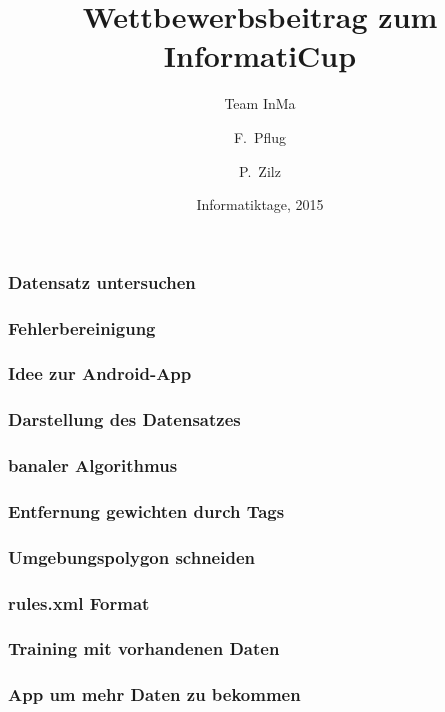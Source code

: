 \documentclass{beamer}
\title[Wettbewerbsbeitrag] %
{Wettbewerbsbeitrag zum InformatiCup}
\subtitle{Team InMa}
\author[Pflug, Zilz] %
{F.~Pflug\inst{1} \and P.~Zilz\inst{2}}
\institute[Leibniz Universität Hannover] %
{
  \inst{1}%
  Fakultät für Elektrotechnik und Informatik\\
  Leibniz Universität Hannover
  \and
  \inst{2}%
  Fakultät für Mathematik und Physik\\
  Leibniz Universität Hannover
}
\date[Informatiktage 2015] %
{Informatiktage, 2015}
\begin{document}
\frame{\titlepage}

\begin{frame}
    \frametitle{Datensatz untersuchen}
\end{frame}

\begin{frame}
    \frametitle{Fehlerbereinigung}
\end{frame}

\begin{frame}
    \frametitle{Idee zur Android-App}
\end{frame}

\begin{frame}
    \frametitle{Darstellung des Datensatzes}
\end{frame}

\begin{frame}
    \frametitle{banaler Algorithmus}
\end{frame}

\begin{frame}
    \frametitle{Entfernung gewichten durch Tags}
\end{frame}

\begin{frame}
    \frametitle{Umgebungspolygon schneiden}
\end{frame}

\begin{frame}
    \frametitle{rules.xml Format}
\end{frame}

\begin{frame}
    \frametitle{Training mit vorhandenen Daten}
\end{frame}

\begin{frame}
    \frametitle{App um mehr Daten zu bekommen}
\end{frame}
\end{document}
